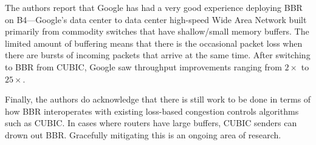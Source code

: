 The authors report that Google has had a very good experience deploying BBR
on B4---Google's data center to data center high-speed Wide Area Network built
primarily from commodity switches that have shallow/small memory buffers.
The limited amount of buffering means that there is the occasional packet
loss when there are bursts of incoming packets that arrive at the same time.
After switching to BBR from CUBIC, Google saw throughput improvements ranging
from $2\times$ to $25\times$.

Finally, the authors do acknowledge that there is still work to be done in terms
of how BBR interoperates with existing loss-based congestion controls algorithms
such as CUBIC. In cases where routers have large buffers, CUBIC senders can
drown out BBR. Gracefully mitigating this is an ongoing area of research.
